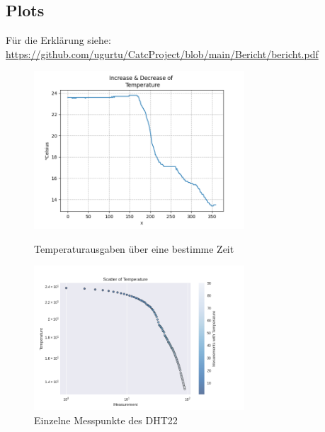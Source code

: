 \documentclass[12pt]{article}
\begin{document}
\subsection{Plots}
Für die Erklärung siehe: \url{https://github.com/ugurtu/CatcProject/blob/main/Bericht/bericht.pdf}
\begin{figure}[H]
\begin{center}
\includegraphics[width=0.7\textwidth]{pics/plot.png}
\caption{Temperaturausgaben über eine bestimme Zeit}
\includegraphics[width=0.7\textwidth]{pics/scatter.png}
\caption{Einzelne Messpunkte des DHT22}
\end{center}
\end{figure}
\newpage
\end{document}
